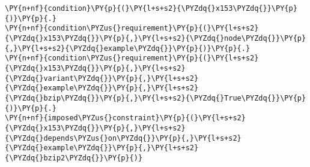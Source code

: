 \begin{Verbatim}[commandchars=\\\{\},fontsize=\footnotesize]
\PY{n+nf}{condition}\PY{p}{(}\PY{l+s+s2}{\PYZdq{}x153\PYZdq{}}\PY{p}{)}\PY{p}{.}
\PY{n+nf}{condition\PYZus{}requirement}\PY{p}{(}\PY{l+s+s2}{\PYZdq{}x153\PYZdq{}}\PY{p}{,}\PY{l+s+s2}{\PYZdq{}node\PYZdq{}}\PY{p}{,}\PY{l+s+s2}{\PYZdq{}example\PYZdq{}}\PY{p}{)}\PY{p}{.}
\PY{n+nf}{condition\PYZus{}requirement}\PY{p}{(}\PY{l+s+s2}{\PYZdq{}x153\PYZdq{}}\PY{p}{,}\PY{l+s+s2}{\PYZdq{}variant\PYZdq{}}\PY{p}{,}\PY{l+s+s2}{\PYZdq{}example\PYZdq{}}\PY{p}{,}\PY{l+s+s2}{\PYZdq{}bzip\PYZdq{}}\PY{p}{,}\PY{l+s+s2}{\PYZdq{}True\PYZdq{}}\PY{p}{)}\PY{p}{.}
\PY{n+nf}{imposed\PYZus{}constraint}\PY{p}{(}\PY{l+s+s2}{\PYZdq{}x153\PYZdq{}}\PY{p}{,}\PY{l+s+s2}{\PYZdq{}depends\PYZus{}on\PYZdq{}}\PY{p}{,}\PY{l+s+s2}{\PYZdq{}example\PYZdq{}}\PY{p}{,}\PY{l+s+s2}{\PYZdq{}bzip2\PYZdq{}}\PY{p}{)}
\end{Verbatim}
